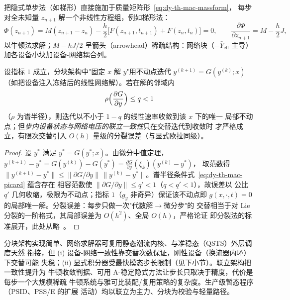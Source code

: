 \begin{definition}[联立（simultaneous）架构]\label{def:dy-th-mac-simultaneous}
把隐式单步法（如梯形）直接施加于质量矩阵形~\eqref{eq:dy-th-mac-massform}，
每步对全未知量 $z_{n+1}$ 解一个非线性方程组，例如梯形法：
\begin{equation}
\Phi(z_{n+1})=M(z_{n+1}-z_n)-\frac{h}{2}\bigl[F(z_{n+1},t_{n+1})+F(z_n,t_n)\bigr]=0,
\qquad
\frac{\partial\Phi}{\partial z_{n+1}}=M-\frac{h}{2}J ,
\label{eq:dy-th-mac-simnewton}
\end{equation}
以牛顿法求解；$M-hJ/2$ 呈箭头（arrowhead）稀疏结构：网络块（$-\bar Y_{\mathrm{eff}}$
主导）加各设备小块加设备-网络耦合列。
\end{definition}

\begin{proposition}[分块交替的收敛条件]\label{prop:dy-th-mac-picard}
设指标 $1$ 成立，分块架构中"固定 $x$ 解 $y$"用不动点迭代
$y^{(k+1)}=G(y^{(k)};x)$（如把设备注入冻结后的线性网络解）。若在解的邻域内
\begin{equation}
\rho\Bigl(\frac{\partial G}{\partial y}\Bigr)\le q<1
\label{eq:dy-th-mac-picard}
\end{equation}
（$\rho$ 为谱半径），则迭代以不小于 $1-q$ 的线性速率收敛到该 $x$ 下的唯一
局部不动点；但\emph{步内设备状态与网络电压的联立一致性}只在交替迭代到收敛时
才严格成立，有限次交替引入 $O(h)$ 量级的分裂误差（与显式欧拉同级）。
\end{proposition}

\begin{proof}
设 $y^*$ 满足 $y^*=G(y^*;x)$。由微分中值定理，
$y^{(k+1)}-y^*=G(y^{(k)})-G(y^*)=\frac{\partial G}{\partial y}(\xi_k)(y^{(k)}-y^*)$，
取范数得 $\lVert y^{(k+1)}-y^*\rVert\le\lVert\partial G/\partial y\rVert\,
\lVert y^{(k)}-y^*\rVert$。谱半径条件式~\eqref{eq:dy-th-mac-picard} 蕴含存在
相容范数使 $\lVert\partial G/\partial y\rVert\le q'<1$（$q<q'<1$），故误差以
公比 $q'$ 几何收缩，极限为不动点；指标 $1$（$g_y$ 非奇异）保证该不动点即
$g(x,\cdot,t)=0$ 的局部唯一解。分裂误差：每步只做一次"代数解$\to$微分步"的
交替相当于对 Lie 分裂的一阶格式，其局部误差为 $O(h^2)$、全局 $O(h)$，严格论证
即分裂法的标准展开，此处从略~\cite{dym:hairer1}。
\end{proof}

\begin{remark}[两架构的工程权衡]\label{rem:dy-th-mac-archtradeoff}
分块架构实现简单、网络求解器可复用静态潮流内核、与准稳态（QSTS）外层调度天然
衔接，但 (i) 设备-网络一致性靠交替次数保证，刚性设备（换流器内环）下交替可能
失稳；(ii) 显式积分器受最快模态步长限制（见下小节）。联立架构把一致性提升为
牛顿收敛判据、可用 A-稳定隐式方法让步长只取决于精度，代价是每步一个大规模稀疏
牛顿系统与雅可比装配/复用策略的复杂度。生产级暂态程序（PSID、PSS/E 的扩展
活动）均以联立为主力、分块为校验与轻量路径。
\end{remark}

